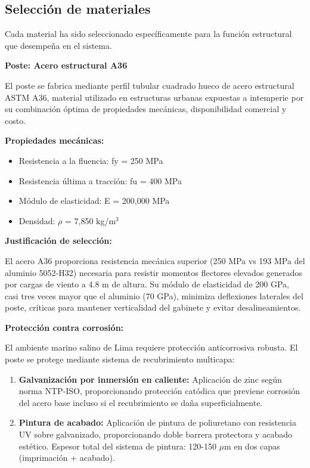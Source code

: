 \documentclass[12pt,a4paper,oneside]{report}
\begin{document}
\subsection{Selección de materiales}\label{selecciuxf3n-de-materiales}

Cada material ha sido seleccionado específicamente para la función estructural que desempeña en el sistema.

\textbf{Poste: Acero estructural A36}

El poste se fabrica mediante perfil tubular cuadrado hueco de acero estructural ASTM A36, material utilizado en estructuras urbanas expuestas a intemperie por su combinación óptima de propiedades mecánicas, disponibilidad comercial y costo.

\textbf{Propiedades mecánicas:}

\begin{itemize}
\item
  Resistencia a la fluencia: fy = 250 MPa
\item
  Resistencia última a tracción: fu = 400 MPa
\item
  Módulo de elasticidad: E = 200,000 MPa
\item
  Densidad: \ensuremath{\rho} = 7,850 kg/m\ensuremath{^{3}}
\end{itemize}

\textbf{Justificación de selección:}

El acero A36 proporciona resistencia mecánica superior (250 MPa vs 193 MPa del aluminio 5052-H32) necesaria para resistir momentos flectores elevados generados por cargas de viento a 4.8 m de altura. Su módulo de elasticidad de 200 GPa, casi tres veces mayor que el aluminio (70 GPa), minimiza deflexiones laterales del poste, críticas para mantener verticalidad del gabinete y evitar desalineamientos.

\textbf{Protección contra corrosión:}

El ambiente marino salino de Lima requiere protección anticorrosiva robusta. El poste se protege mediante sistema de recubrimiento multicapa:

\begin{enumerate}
\def\labelenumi{\arabic{enumi}.}
\item
  \textbf{Galvanización por inmersión en caliente:} Aplicación de zinc según norma NTP-ISO, proporcionando protección catódica que previene corrosión del acero base incluso si el recubrimiento se daña superficialmente.
\item
  \textbf{Pintura de acabado:} Aplicación de pintura de poliuretano con resistencia UV sobre galvanizado, proporcionando doble barrera protectora y acabado estético. Espesor total del sistema de pintura: 120-150 \ensuremath{\mu}m en dos capas (imprimación + acabado).
\end{enumerate}
\end{document}
